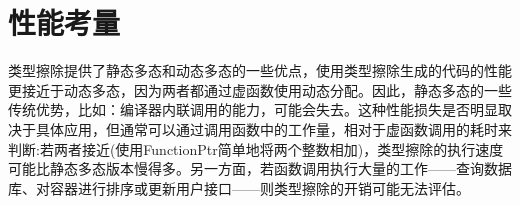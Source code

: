 \section{性能考量}
类型擦除提供了静态多态和动态多态的一些优点，使用类型擦除生成的代码的性能更接近于动态多态，因为两者都通过虚函数使用动态分配。因此，静态多态的一些传统优势，比如：编译器内联调用的能力，可能会失去。这种性能损失是否明显取决于具体应用，但通常可以通过调用函数中的工作量，相对于虚函数调用的耗时来判断:若两者接近(使用FunctionPtr简单地将两个整数相加)，类型擦除的执行速度可能比静态多态版本慢得多。另一方面，若函数调用执行大量的工作——查询数据库、对容器进行排序或更新用户接口——则类型擦除的开销可能无法评估。